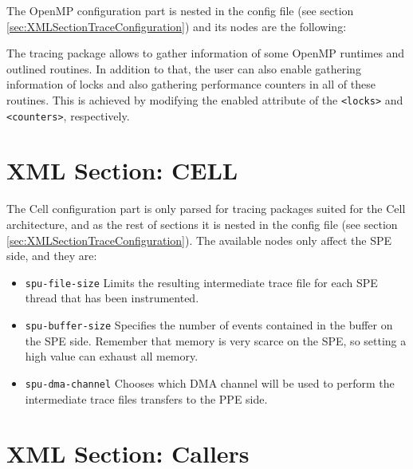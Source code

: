 The OpenMP configuration part is nested in the config file (see section \ref{sec:XMLSectionTraceConfiguration}) and its nodes are the following:



The tracing package allows to gather information of some OpenMP runtimes and outlined routines. In addition to that, the user can also enable gathering information of locks and also gathering performance counters in all of these routines. This is achieved by modifying the enabled attribute of the {\tt <locks>} and {\tt <counters>}, respectively.


\section{XML Section: CELL}\label{sec:XMLcell}

The Cell configuration part is only parsed for tracing packages suited for the Cell architecture, and as the rest of sections it is nested in the config file (see section \ref{sec:XMLSectionTraceConfiguration}). The available nodes only affect the SPE side, and they are:



\begin{itemize}
 \item {\tt spu-file-size} Limits the resulting intermediate trace file for each SPE thread that has been instrumented.
 \item {\tt spu-buffer-size} Specifies the number of events contained in the buffer on the SPE side. Remember that memory is very scarce on the SPE, so setting a high value can exhaust all memory.
 \item {\tt spu-dma-channel} Chooses which {DMA} channel will be used to perform the intermediate trace files transfers to the PPE side.
\end{itemize}


\section{XML Section: Callers}\label{sec:XMLSectionCallers}

